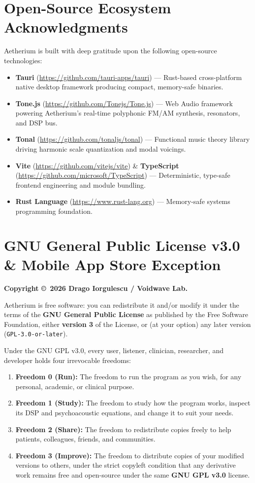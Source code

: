 \documentclass[11pt,oneside,openany]{book}
\begin{document}
\section{Open-Source Ecosystem Acknowledgments}

Aetherium is built with deep gratitude upon the following open-source technologies:
\begin{itemize}
  \item \textbf{Tauri} (\url{https://github.com/tauri-apps/tauri}) --- Rust-based cross-platform native desktop framework producing compact, memory-safe binaries.
  \item \textbf{Tone.js} (\url{https://github.com/Tonejs/Tone.js}) --- Web Audio framework powering Aetherium's real-time polyphonic FM/AM synthesis, resonators, and DSP bus.
  \item \textbf{Tonal} (\url{https://github.com/tonaljs/tonal}) --- Functional music theory library driving harmonic scale quantization and modal voicings.
  \item \textbf{Vite} (\url{https://github.com/vitejs/vite}) \& \textbf{TypeScript} (\url{https://github.com/microsoft/TypeScript}) --- Deterministic, type-safe frontend engineering and module bundling.
  \item \textbf{Rust Language} (\url{https://www.rust-lang.org}) --- Memory-safe systems programming foundation.
\end{itemize}

\section{GNU General Public License v3.0 \& Mobile App Store Exception}

\textbf{Copyright \copyright\ 2026 Drago Iorgulescu / Voidwave Lab.}

Aetherium is free software: you can redistribute it and/or modify it under the terms of the \textbf{GNU General Public License} as published by the Free Software Foundation, either \textbf{version 3} of the License, or (at your option) any later version (\texttt{GPL-3.0-or-later}).

Under the GNU GPL v3.0, every user, listener, clinician, researcher, and developer holds four irrevocable freedoms:
\begin{enumerate}
  \item \textbf{Freedom 0 (Run):} The freedom to run the program as you wish, for any personal, academic, or clinical purpose.
  \item \textbf{Freedom 1 (Study):} The freedom to study how the program works, inspect its DSP and psychoacoustic equations, and change it to suit your needs.
  \item \textbf{Freedom 2 (Share):} The freedom to redistribute copies freely to help patients, colleagues, friends, and communities.
  \item \textbf{Freedom 3 (Improve):} The freedom to distribute copies of your modified versions to others, under the strict copyleft condition that any derivative work remains free and open-source under the same \textbf{GNU GPL v3.0} license.
\end{enumerate}
\end{document}
